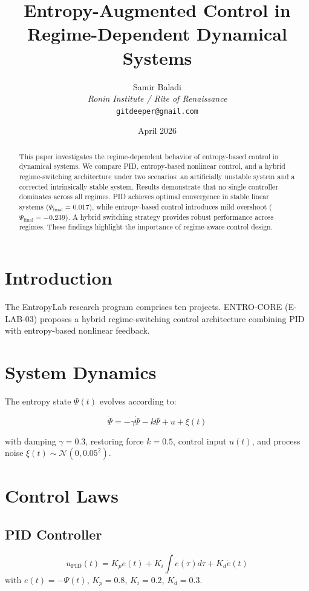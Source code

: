 \documentclass[twocolumn]{article}
\title{Entropy-Augmented Control in Regime-Dependent Dynamical Systems}
\author{Samir Baladi\\
  \textit{Ronin Institute / Rite of Renaissance}\\
  \texttt{gitdeeper@gmail.com}
}
\date{April 2026}
\begin{document}
\maketitle

\begin{abstract}
This paper investigates the regime-dependent behavior of entropy-based control in dynamical systems. We compare PID, entropy-based nonlinear control, and a hybrid regime-switching architecture under two scenarios: an artificially unstable system and a corrected intrinsically stable system. Results demonstrate that no single controller dominates across all regimes. PID achieves optimal convergence in stable linear systems ($\Psi_{\text{final}} = 0.017$), while entropy-based control introduces mild overshoot ($\Psi_{\text{final}} = -0.239$). A hybrid switching strategy provides robust performance across regimes. These findings highlight the importance of regime-aware control design.
\end{abstract}

\section{Introduction}

The EntropyLab research program comprises ten projects. ENTRO-CORE (E-LAB-03) proposes a hybrid regime-switching control architecture combining PID with entropy-based nonlinear feedback.

\section{System Dynamics}

The entropy state $\Psi(t)$ evolves according to:

\begin{equation}
\ddot{\Psi} = -\gamma\dot{\Psi} - k\Psi + u + \xi(t)
\label{eq:dynamics}
\end{equation}

with damping $\gamma = 0.3$, restoring force $k = 0.5$, control input $u(t)$, and process noise $\xi(t) \sim \mathcal{N}(0, 0.05^2)$.

\section{Control Laws}

\subsection{PID Controller}
\begin{equation}
u_{\text{PID}}(t) = K_p e(t) + K_i \int e(\tau)d\tau + K_d \dot{e}(t)
\end{equation}
with $e(t) = -\Psi(t)$, $K_p=0.8$, $K_i=0.2$, $K_d=0.3$.
\end{document}
